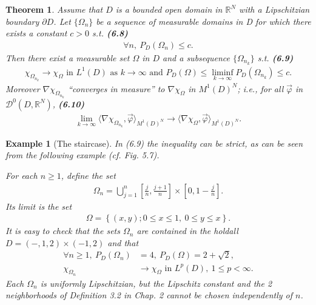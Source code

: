 \documentclass{book}
\numberwithin{equation}{section}
\newtheorem{theorem}{Theorem}[section]
\newtheorem{example}{Example}[section]
\begin{document}
\begin{enumerate}
    \begin{theorem}
        Assume that $D$ is a bounded open domain in $\mathbb{R}^N$ with a Lipschitzian boundary $\partial D$. Let $\{\Omega_n\}$ be a sequence of measurable domains in D for which there exists a constant $c > 0$ s.t. \textbf{(6.8)}
        \begin{align*}
            \forall n,\ P_D(\Omega_n)\le c.
        \end{align*}
        Then there exist a measurable set $\Omega$ in $D$ and a subsequence $\{\Omega_{n_k}\}$ s.t. \textbf{(6.9)}
        \begin{align*}
            \chi_{\Omega_{n_k}}\to\chi_\Omega \mbox{ in } L^1(D) \mbox{ as } k\to\infty \mbox{ and } P_D(\Omega)\le\liminf_{k\to\infty} P_D(\Omega_{n_k})\le c.
        \end{align*}
        Moreover $\nabla\chi_{\Omega_{n_k}}$ ``converges in measure'' to $\nabla\chi_\Omega$ in $M^1(D)^N$; i.e., for all $\vec{\varphi}$ in $\mathcal{D}^0(D,\mathbb{R}^N)$, \textbf{(6.10)}
        \begin{align*}
            \lim_{k\to\infty} \langle\nabla\chi_{\Omega_{n_k}},\vec{\varphi}\rangle_{M^1(D)^N}\to\langle\nabla\chi_\Omega,\vec{\varphi}\rangle_{M^1(D)^N}.
        \end{align*}
    \end{theorem}

    \begin{example}[The staircase]
        In (6.9) the inequality can be strict, as can be seen from the following example (cf. Fig. 5.7).
        
        For each $n\ge 1$, define the set
        \begin{align*}
            \Omega_n = \bigcup_{j=1}^n \left[\frac{j}{n},\frac{j+1}{n}\right]\times\left[0,1 - \frac{j}{n}\right].
        \end{align*}
        Its limit is the set
        \begin{align*}
            \Omega = \left\{(x,y);0\le x\le 1,\ 0\le y\le x\right\}.
        \end{align*}
        It is easy to check that the sets $\Omega_n$ are contained in the holdall $D = (-,1,2)\times(-1,2)$ and that
        \begin{align*}
            \forall n\ge 1,\ P_D(\Omega_n) &= 4,\ P_D(\Omega) = 2 + \sqrt{2},\\
            \chi_{\Omega_n}&\to\chi_\Omega \mbox{ in } L^p(D),\ 1\le p < \infty.
        \end{align*}
        Each $\Omega_n$ is uniformly Lipschitzian, but the Lipschitz constant and the 2 neighborhoods of Definition 3.2 in Chap. 2 cannot be chosen independently of $n$.
    \end{example}
    

\end{enumerate}
\end{document}
